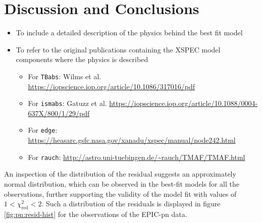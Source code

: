 \section{Discussion and Conclusions}
	
	\begin{itemize}
		\item To include a detailed description of the physics behind the best fit model
		\item To refer to the original publications containing the XSPEC model components where the physics is described
		\begin{itemize}
			\item For \texttt{TBabs}: Wilms et al. \url{https://iopscience.iop.org/article/10.1086/317016/pdf}
			\item For \texttt{ismabs}: Gatuzz et al. \url{https://iopscience.iop.org/article/10.1088/0004-637X/800/1/29/pdf}
			\item For \texttt{edge}: \url{https://heasarc.gsfc.nasa.gov/xanadu/xspec/manual/node242.html}
			\item For \texttt{rauch}: \url{http://astro.uni-tuebingen.de/~rauch/TMAF/TMAF.html}
		\end{itemize}
	\end{itemize}
	An inspection of the distribution of the residual suggests an approximately normal distribution, which can be observed in the best-fit models for all the observations, further supporting the validity of the model fit with values of $1<\chi^2_\text{red}<2$. Such a distribution of the residuals is displayed in figure \ref{fig:pn:resid-hist} for the observations of the EPIC-pn data.
	
